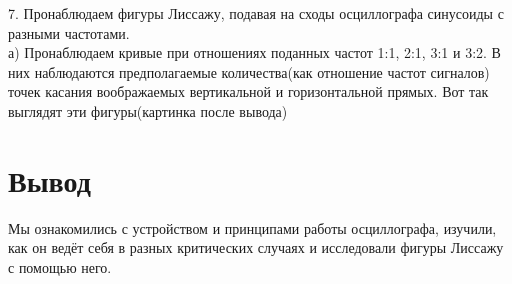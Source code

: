 \documentclass[a4paper, 12pt]{article}
\begin{document}
		7. Пронаблюдаем фигуры Лиссажу, подавая на сходы осциллографа синусоиды с разными частотами. \\
			а) Пронаблюдаем кривые при отношениях поданных частот 1:1, 2:1, 3:1 и 3:2. В них наблюдаются предполагаемые количества(как отношение частот сигналов) точек касания воображаемых вертикальной и горизонтальной прямых.
			Вот так выглядят эти фигуры(картинка после вывода)
			\begin{figure}[h]
			\end{figure}
	\section*{Вывод}
		Мы ознакомились с устройством и принципами работы осциллографа, изучили, как он ведёт себя в разных критических случаях и исследовали фигуры Лиссажу с помощью него.
\end{document}
